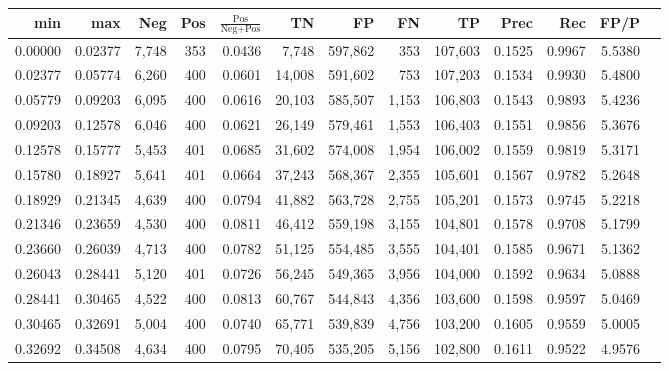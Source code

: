 \begin{tabular}{rrrrrrrrrrrrr}
\toprule
    min &     max &   Neg & Pos & $\frac{\text{Pos}}{\text{Neg}+\text{Pos}}$ &      TN &      FP &      FN &      TP &   Prec &    Rec &   FP/P \\
\midrule
0.00000 & 0.02377 & 7,748 & 353 &                                     0.0436 &   7,748 & 597,862 &     353 & 107,603 & 0.1525 & 0.9967 & 5.5380 \\
0.02377 & 0.05774 & 6,260 & 400 &                                     0.0601 &  14,008 & 591,602 &     753 & 107,203 & 0.1534 & 0.9930 & 5.4800 \\
0.05779 & 0.09203 & 6,095 & 400 &                                     0.0616 &  20,103 & 585,507 &   1,153 & 106,803 & 0.1543 & 0.9893 & 5.4236 \\
0.09203 & 0.12578 & 6,046 & 400 &                                     0.0621 &  26,149 & 579,461 &   1,553 & 106,403 & 0.1551 & 0.9856 & 5.3676 \\
0.12578 & 0.15777 & 5,453 & 401 &                                     0.0685 &  31,602 & 574,008 &   1,954 & 106,002 & 0.1559 & 0.9819 & 5.3171 \\
0.15780 & 0.18927 & 5,641 & 401 &                                     0.0664 &  37,243 & 568,367 &   2,355 & 105,601 & 0.1567 & 0.9782 & 5.2648 \\
0.18929 & 0.21345 & 4,639 & 400 &                                     0.0794 &  41,882 & 563,728 &   2,755 & 105,201 & 0.1573 & 0.9745 & 5.2218 \\
0.21346 & 0.23659 & 4,530 & 400 &                                     0.0811 &  46,412 & 559,198 &   3,155 & 104,801 & 0.1578 & 0.9708 & 5.1799 \\
0.23660 & 0.26039 & 4,713 & 400 &                                     0.0782 &  51,125 & 554,485 &   3,555 & 104,401 & 0.1585 & 0.9671 & 5.1362 \\
0.26043 & 0.28441 & 5,120 & 401 &                                     0.0726 &  56,245 & 549,365 &   3,956 & 104,000 & 0.1592 & 0.9634 & 5.0888 \\
0.28441 & 0.30465 & 4,522 & 400 &                                     0.0813 &  60,767 & 544,843 &   4,356 & 103,600 & 0.1598 & 0.9597 & 5.0469 \\
0.30465 & 0.32691 & 5,004 & 400 &                                     0.0740 &  65,771 & 539,839 &   4,756 & 103,200 & 0.1605 & 0.9559 & 5.0005 \\
0.32692 & 0.34508 & 4,634 & 400 &                                     0.0795 &  70,405 & 535,205 &   5,156 & 102,800 & 0.1611 & 0.9522 & 4.9576 \\

\end{tabular}
